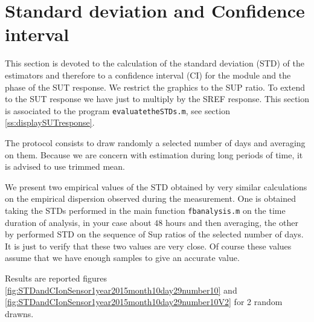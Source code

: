 \newpage\clearpage
\section{Standard deviation and Confidence interval}
This section is devoted to the calculation of the standard deviation (STD) of the estimators and therefore to a confidence interval (CI) for the module and the phase of the SUT response. We restrict the graphics to the SUP ratio. To extend to the SUT response we have just to multiply by the SREF response. This section is associated to the program {\tt evaluatetheSTDs.m}, see section
\ref{ss:displaySUTresponse}.

The protocol consists to draw randomly a selected number of days and averaging on them. Because we are concern with estimation during long periods of time, it is advised to use trimmed mean.

We present  two empirical values of the STD obtained by very similar calculations on the empirical dispersion observed during the measurement. One is obtained taking the STDs performed in the main function {\tt fbanalysis.m} on the time duration of analysis, in your case about $48$ hours and then averaging, the other by performed STD on the sequence of Sup ratios of the selected number of days. It is just to verify that these two values are very close. Of course these values assume that we have enough samples to give an accurate value. 

Results are reported figures \ref{fig:STDandCIonSensor1year2015month10day29number10} and \ref{fig:STDandCIonSensor1year2015month10day29number10V2} for 2 random drawns.


